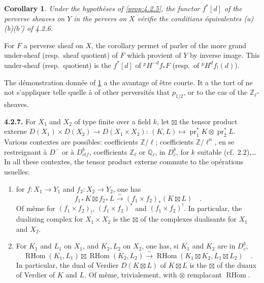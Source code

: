 \documentclass[12pt,a4paper]{article}
\theoremstyle{plain}
\newtheorem{corollary}[theorem]{Corollary}
\theoremstyle{definition}
\DeclareMathOperator{\RHom}{RHom}
\newcommand{\isom}{\xrightarrow{\sim}}
\providecommand{\pr}{\operatorname{pr}}
\providecommand{\RHom}{\operatorname{RHom}}
\begin{document}
{{\begin{corollary}\label{cor:4.2.6.2}
Under the hypoth\`{e}ses of \ref{prop:4.2.5}, the functor $f^{*}[d]$ of the perverse sheaves on $Y$ in the pervers on $X$ v\'{e}rifie the conditions \'{e}quivalentes (a)(b)(b') of 4.2.6.
\end{corollary}

For $F$ a perverse sheaf on $X$, the corollary permet of parler of the more grand under-sheaf (resp.\ sheaf quotient) of $F$ which provient of $Y$ by inverse image. This under-sheaf (resp.\ quotient) is the $f^{*}[d]$ of ${}^{p}H^{-d}f_{*}F$ (resp.\ of ${}^{p}H^{d}f_{!}(d)$).

The d\'{e}monstration donn\'{e}e of \ref{cor:4.2.6.2} a the avantage of \^{e}tre courte. It a the tort of ne not s'appliquer telle quelle \`{a} of other perversit\'{e}s that $p_{1/2}$, or to the cas of the $\mathbb{Z}_{\ell}$-sheaves.

\noindent\textbf{4.2.7.} For $X_{1}$ and $X_{2}$ of type finite over a field $k$, let $\boxtimes$ the tensor product externe $D(X_{1}) \times D(X_{2}) \longrightarrow D(X_{1} \times X_{2})$: $(K,L) \longmapsto \pr_{1}^{*}K \otimes \pr_{2}^{*}L$. Various contextes are possibles: coefficients $\mathbb{Z}/\ell$; coefficients $\mathbb{Z}/\ell^{n}$, en se restreignant \`{a} $D^{-}$ or \`{a} $D_{ctf}^{b}$, coefficients $\mathbb{Z}_{\ell}$ or $\mathbb{Q}_{\ell}$, in $D_{c}^{b}$, for $k$ suitable (cf.\ 2.2),\ldots In all these contextes, the tensor product externe commute to the op\'{e}rations usuelles:
\begin{enumerate}
\item[(a)] for $f: X_{1} \to Y_{1}$ and $f_{2}: X_{2} \to Y_{2}$, one has
\[
f_{1*}K \boxtimes f_{2*}L \isom (f_{1} \times f_{2})_{*}(K \boxtimes L)\quad.
\]
Of m\^{e}me for $(f_{1} \times f_{2})_{!}$, $(f_{1} \times f_{2})^{*}$ and $(f_{1} \times f_{2})^{!}$. In particular, the dualizing complex for $X_{1} \times X_{2}$ is the $\boxtimes$ of the complexes dualisants for $X_{1}$ and $X_{2}$.
\item[(b)] For $K_{1}$ and $L_{1}$ on $X_{1}$, and $K_{2}, L_{2}$ on $X_{2}$, one has, si $K_{1}$ and $K_{2}$ are in $D_{c}^{b}$,
\[
\RHom(K_{1},L_{1}) \boxtimes \RHom(K_{2},L_{2}) \isom \RHom(K_{1} \boxtimes K_{2}, L_{1} \boxtimes L_{2})\quad.
\]
In particular, the dual of Verdier $D(K \boxtimes L)$ of $K \boxtimes L$ is the $\boxtimes$ of the duaux of Verdier of $K$ and $L$. Of m\^{e}me, trivialement, with $\otimes$ remplacant $\RHom$.
\end{enumerate}

}}
\end{document}
